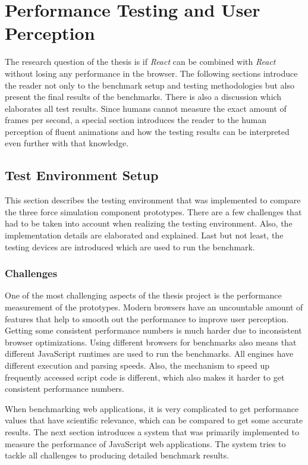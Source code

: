 \chapter{Performance Testing and User Perception}
\label{cha:performance}

The research question of the thesis is if \emph{React} can be combined with \emph{React} without losing any performance in the browser. The following sections introduce the reader not only to the benchmark setup and testing methodologies but also present the final results of the benchmarks. There is also a discussion which elaborates all test results. Since humans cannot measure the exact amount of frames per second, a special section introduces the reader to the human perception of fluent animations and how the testing results can be interpreted even further with that knowledge.

\section{Test Environment Setup}

This section describes the testing environment that was implemented to compare the three force simulation component prototypes. There are a few challenges that had to be taken into account when realizing the testing environment. Also, the implementation details are elaborated and explained. Last but not least, the testing devices are introduced which are used to run the benchmark.

\subsection{Challenges}

One of the most challenging aspects of the thesis project is the performance measurement of the prototypes. Modern browsers have an uncountable amount of features that help to smooth out the performance to improve user perception. Getting some consistent performance numbers is much harder due to inconsistent browser optimizations. Using different browsers for benchmarks also means that different JavaScript runtimes are used to run the benchmarks. All engines have different execution and parsing speeds. Also, the mechanism to speed up frequently accessed script code is different, which also makes it harder to get consistent performance numbers.

When benchmarking web applications, it is very complicated to get performance values that have scientific relevance, which can be compared to get some accurate results. The next section introduces a system that was primarily implemented to measure the performance of JavaScript web applications. The system tries to tackle all challenges to producing detailed benchmark results.

